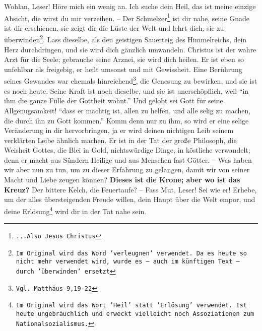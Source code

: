 Wohlan, Leser! Höre mich ein wenig an. Ich suche dein Heil, das ist meine
einzige Absicht, die wirst du mir verzeihen. -- Der
Schmelzer\footnote{\texttt{...Also
Jesus Christus}} ist dir nahe, seine Gnade ist dir erschienen, sie zeigt dir die
Lüste der Welt und lehrt dich, sie zu überwinden\footnote{\texttt{Im Original
wird das
Word 'verleugnen' verwendet. Da es heute so nicht mehr verwendet wird, wurde
es -- auch im künftigen Text -- durch 'überwinden' ersetzt}}. Lass dieselbe,
als den geistigen Sauerteig des Himmelreichs, dein Herz durchdringen, und sie
wird dich gänzlich umwandeln. Christus ist der wahre Arzt für die Seele;
gebrauche seine Arznei, sie wird dich heilen. Er ist eben so unfehlbar als
freigebig, er heilt umsonst und mit Gewissheit. Eine Berührung seines Gewandes
war ehemals hinreichend\footnote{\texttt{Vgl. Matthäus 9,19-22}}, die Genesung
zu
bewirken, und sie ist es noch heute. Seine Kraft ist noch dieselbe, und sie ist
unerschöpflich, weil "`in ihm die ganze Fülle der Gottheit wohnt."' Und gelobt
sei Gott für seine Allgenugsamkeit! "`dass er mächtig ist, allen zu helfen, und
alle selig zu machen, die durch ihn zu Gott kommen."' Komm denn nur zu ihm, so
wird er eine selige Veränderung in dir hervorbringen, ja er wird deinen
nichtigen Leib seinem verklärten Leibe ähnlich machen. Er ist in der Tat der
große Philosoph, die Weisheit Gottes, die Blei in Gold, nichtswürdige Dinge, in
köstliche verwandelt; denn er macht aus Sündern Heilige und aus Menschen fast
Götter. -- Was haben wir aber nun zu tun, um zu dieser Erfahrung zu gelangen,
damit wir von seiner Macht und Liebe zeugen können? 
 \textbf{Dieses ist die
Krone; aber wo ist das Kreuz?} Der bittere Kelch, die Feuertaufe? -- Fass Mut,
Leser! Sei wie er! Erhebe, um der alles übersteigenden Freude willen, dein Haupt
über die Welt empor, und deine Erlösung\footnote{\texttt{Im Original wird das
Wort
'Heil' statt 'Erlösung' verwendet. Ist heute ungebräuchlich und erweckt
vielleicht noch Assoziationen zum Nationalsozialismus.}} wird dir in der Tat
nahe sein.

\medskip

